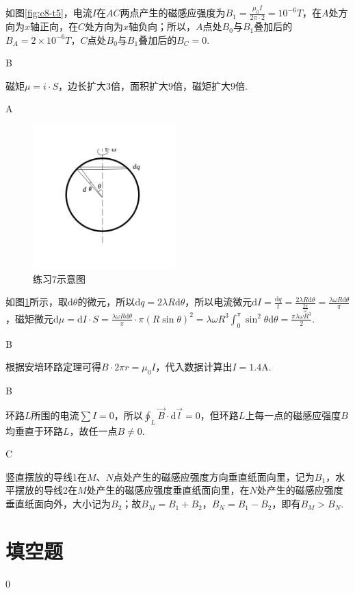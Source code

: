 \documentclass[b5paper,opensource,sourcefont,parskip]{qyxf-book}
\newcommand{\di}[1]{\mathrm{d}#1}
\begin{document}
\solve
如图\ref{fig:c8-t5}，电流$I$在$AC$两点产生的磁感应强度为$B_1=\frac{\mu_0I}{2\pi\cdot2}=10^{-6}T$，在$A$处方向为$x$轴正向，在$C$处方向为$x$轴负向；所以，$A$点处$B_0$与$B_1$叠加后的$B_A=2\times10^{-6}T$，$C$点处$B_0$与$B_1$叠加后的$B_C=0$.

B

\solve
磁矩$\mu=i\cdot S$，边长扩大3倍，面积扩大9倍，磁矩扩大9倍.

A

\begin{figure}[htbp]  %
	\centering
	\includegraphics[width=15em, height=15em]{Chp8_illus2.jpg}
	\caption{练习7示意图}\label{fig:c8-t7}
\end{figure}

\solve
如图\ref{fig:c8-t7}所示，取$\di\theta$的微元，所以$\di q=2\lambda R\di\theta$，所以电流微元$\di I=\frac{\di q}{t}=\frac{2\lambda R\di\theta}{\frac{2\pi}{\omega}}=\frac{\lambda\omega R\di\theta}{\pi}$，磁矩微元$\di\mu=\di I\cdot S=\frac{\lambda\omega R\di\theta}{\pi}\cdot\pi(R\sin\theta)^2=\lambda\omega R^3\int_0^\pi\sin^2\theta\di\theta=\frac{\pi\lambda\omega R^3}{2}$.

B

\solve
根据安培环路定理可得$B\cdot 2\pi r=\mu_0I$，代入数据计算出$I=1.4$A.

B

\solve
环路$L$所围的电流$\sum I=0$，所以$\oint_L\vec{B}\cdot\di\vec{l}=0$，但环路$L$上每一点的磁感应强度$B$均垂直于环路$L$，故任一点$B\ne0$.

C

\solve
竖直摆放的导线1在$M$、$N$点处产生的磁感应强度方向垂直纸面向里，记为$B_1$，水平摆放的导线2在$M$处产生的磁感应强度垂直纸面向里，在$N$处产生的磁感应强度垂直纸面向外，大小记为$B_2$；故$B_M=B_1+B_2$，$B_N=B_1-B_2$，即有$B_M>B_N$.

\section{填空题}
 0
\end{document}
